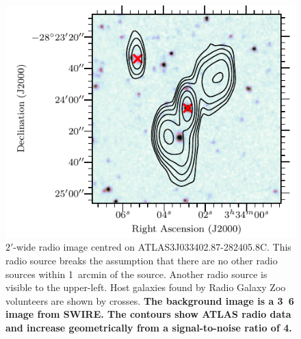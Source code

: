 \documentclass[fleqn,usenatbib,usedcolumn]{mnras}
\newcommand{\edited}[1]{{\bf {#1}}}
\begin{document}
    \begin{figure}
      \centering
      \includegraphics[width=\linewidth]{images/CI0077C1_fig.pdf}
      \caption{$2'$-wide radio image centred on ATLAS3\textunderscore{}J033402.87-282405.8C.
        This radio source breaks the assumption that there are no other radio
        sources within 1~arcmin of the source. Another radio source is visible
        to the upper-left. Host galaxies found by Radio Galaxy Zoo volunteers
        are shown by crosses. \edited{The background image
        is a \unit{3.6}{\micro\meter} image from SWIRE. The contours show ATLAS radio
        data and increase geometrically from a signal-to-noise ratio of 4.}}
      \label{fig:broken-isolation}
    \end{figure}
\end{document}
